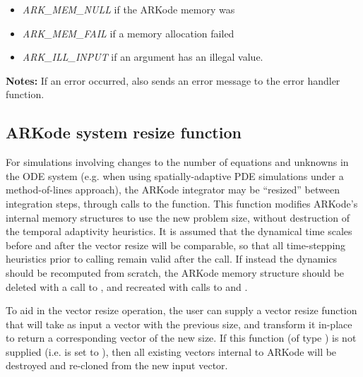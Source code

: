 \documentclass[letterpaper,10pt,english]{sphinxmanual}
\begin{document}
\begin{fulllineitems}
\begin{description}
\begin{itemize}
\item {} 
\emph{ARK\_MEM\_NULL}  if the ARKode memory was 

\item {} 
\emph{ARK\_MEM\_FAIL}  if a memory allocation failed

\item {} 
\emph{ARK\_ILL\_INPUT} if an argument has an illegal value.

\end{itemize}

\end{description}

\textbf{Notes:} If an error occurred, {\hyperref[c_interface/User_callable:ARKodeReInit]{}} also
sends an error message to the error handler function.

\end{fulllineitems}



\subsection{ARKode system resize function}
\label{c_interface/User_callable:arkode-system-resize-function}\label{c_interface/User_callable:cinterface-resizing}
For simulations involving changes to the number of equations and
unknowns in the ODE system (e.g. when using spatially-adaptive
PDE simulations under a method-of-lines approach), the ARKode
integrator may be ``resized'' between integration steps, through calls
to the {\hyperref[c_interface/User_callable:ARKodeResize]{}} function. This function modifies
ARKode's internal memory structures to use the new problem size,
without destruction of the temporal adaptivity heuristics.  It is
assumed that the dynamical time scales before and after the vector
resize will be comparable, so that all time-stepping heuristics prior
to calling {\hyperref[c_interface/User_callable:ARKodeResize]{}} remain valid after the call.  If
instead the dynamics should be recomputed from scratch, the ARKode
memory structure should be deleted with a call to
{\hyperref[c_interface/User_callable:ARKodeFree]{}}, and recreated with calls to
{\hyperref[c_interface/User_callable:ARKodeCreate]{}} and {\hyperref[c_interface/User_callable:ARKodeInit]{}}.

To aid in the vector resize operation, the user can supply a vector
resize function that will take as input a vector with the previous
size, and transform it in-place to return a corresponding vector of
the new size.  If this function (of type {\hyperref[c_interface/User_supplied:ARKVecResizeFn]{}})
is not supplied (i.e. is set to ), then all existing vectors
internal to ARKode will be destroyed and re-cloned from the new input
vector.
\end{document}
